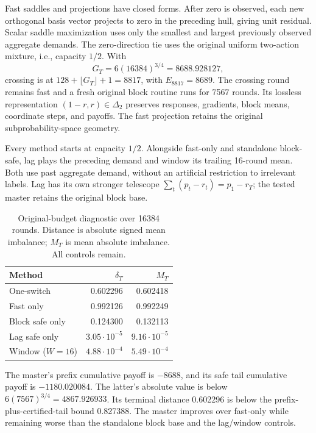 Fast saddles and projections have closed forms. After zero is observed,
each new orthogonal basis vector projects to zero in the preceding hull,
giving unit residual. Scalar saddle maximization uses only the smallest
and largest previously observed aggregate demands. The zero-direction tie
uses the original uniform two-action mixture, i.e., capacity $1/2$.
With
\[
 G_T=6(16384)^{3/4}=8688.928127,
\]
crossing is at $128+\lfloor G_T\rfloor+1=8817$, with $E_{8817}=8689$.
The crossing round remains fast and a fresh original block routine runs
for 7567 rounds. Its lossless representation $(1-r,r)\in\Delta_2$ preserves
responses, gradients, block means, coordinate steps, and payoffs.
The fast projection retains the original subprobability-space geometry.

Every method starts at capacity $1/2$. Alongside fast-only and standalone
block-safe, lag plays the preceding demand and window its trailing 16-round
mean. Both use past aggregate demand, without an artificial restriction
to irrelevant labels.
Lag has its own stronger telescope $\sum_t(p_t-r_t)=p_1-r_T$; the tested
master retains the original block base.

\begin{table}[t]
  \caption{Original-budget diagnostic over 16384 rounds. Distance is absolute
  signed mean imbalance; $M_T$ is mean absolute imbalance. All controls remain.}
  \label{tab:supp-original-budget}
  \centering
  \begin{tabular}{lrr}
    \toprule
    Method & $\delta_T$ & $M_T$ \\
    \midrule
    One-switch & 0.602296 & 0.602418 \\
    Fast only & 0.992126 & 0.992249 \\
    Block safe only & 0.124300 & 0.132113 \\
    Lag safe only & $3.05\cdot10^{-5}$ & $9.16\cdot10^{-5}$ \\
    Window ($W=16$) & $4.88\cdot10^{-4}$ & $5.49\cdot10^{-4}$ \\
    \bottomrule
  \end{tabular}
\end{table}

The master's prefix cumulative payoff is $-8688$, and its safe tail
cumulative payoff is $-1180.020084$. The latter's absolute value is below
$6(7567)^{3/4}=4867.926933$. Its terminal distance 0.602296 is below the
prefix-plus-certified-tail bound 0.827388.
The master improves over fast-only while remaining worse than the standalone
block base and the lag/window controls.


